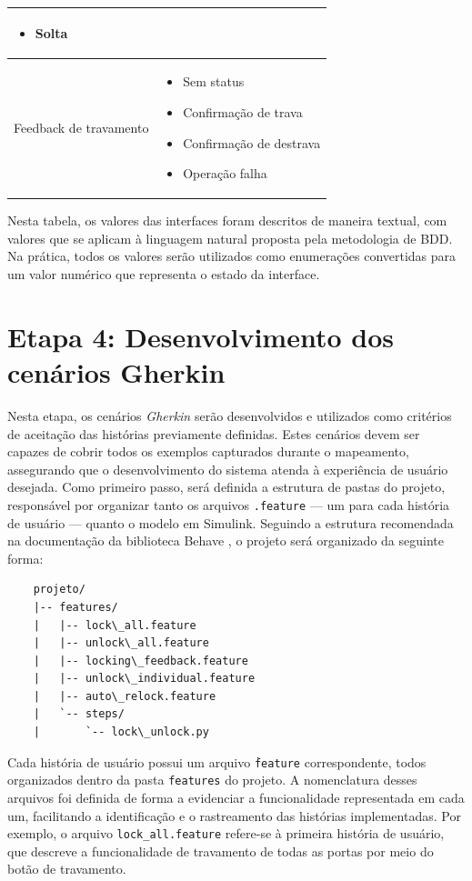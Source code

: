 \begin{quadro}[h]
\begin{tabular}{|p{5cm}|p{7cm}|}
\begin{itemize}[topsep=0pt, partopsep=0pt, leftmargin=*]
    \item Solta
\end{itemize} \\
\hline
Feedback de travamento &
\begin{itemize}[topsep=0pt, partopsep=0pt, leftmargin=*]
    \item Sem status
    \item Confirmação de trava
    \item Confirmação de destrava
    \item Operação falha
\end{itemize} \\
\hline
\end{tabular}
\end{quadro}

Nesta tabela, os valores das interfaces foram descritos de maneira textual, com valores que se aplicam à linguagem natural proposta pela metodologia de BDD. 
Na prática, todos os valores serão utilizados como enumerações convertidas para um valor numérico que representa o estado da interface.

\section{\textbf{Etapa 4: Desenvolvimento dos cenários Gherkin}}

Nesta etapa, os cenários \textit{Gherkin} serão desenvolvidos e utilizados como critérios de aceitação das histórias previamente definidas. Estes cenários devem ser capazes 
de cobrir todos os exemplos capturados durante o mapeamento, assegurando que o desenvolvimento do sistema atenda à experiência de usuário desejada.
Como primeiro passo, será definida a estrutura de pastas do projeto, responsável por organizar tanto os arquivos \texttt{.feature} — um para cada história de usuário — 
quanto o modelo em Simulink. Seguindo a estrutura recomendada na documentação da biblioteca Behave \cite{behaveDocs}, o projeto será organizado da seguinte forma:

\begin{verbatim}
    projeto/
    |-- features/
    |   |-- lock\_all.feature
    |   |-- unlock\_all.feature
    |   |-- locking\_feedback.feature
    |   |-- unlock\_individual.feature
    |   |-- auto\_relock.feature
    |   `-- steps/
    |       `-- lock\_unlock.py
\end{verbatim}

Cada história de usuário possui um arquivo \texttt{\.feature} correspondente, todos organizados dentro da pasta \texttt{features} do projeto. A nomenclatura desses 
arquivos foi definida de forma a evidenciar a funcionalidade representada em cada um, facilitando a identificação e o rastreamento das histórias implementadas. 
Por exemplo, o arquivo \texttt{lock\_all.feature} refere-se à primeira história de usuário, que descreve a funcionalidade de travamento de todas as portas 
por meio do botão de travamento.

